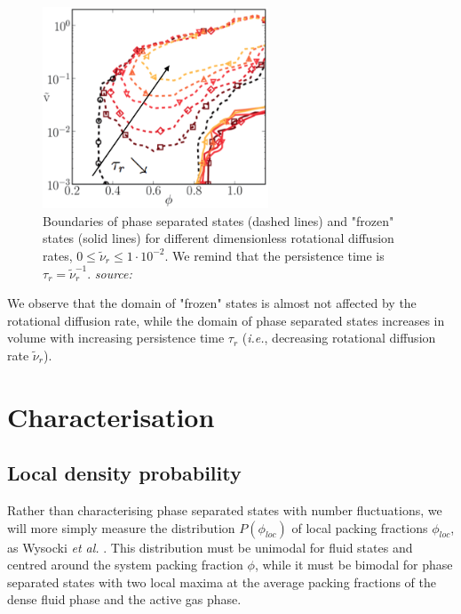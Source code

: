 \documentclass[class=report, float=false, crop=false]{standalone}
\begin{document}
\begin{figure}[h!]
\centering
\includegraphics[width=0.6\textwidth]{figures/images/phase_boundary.png}
\caption{Boundaries of phase separated states (dashed lines) and "frozen" states (solid lines) for different dimensionless rotational diffusion rates, $0 \leq \tilde{\nu}_r \leq 1\cdot10^{-2}$. We remind that the persistence time is $\tau_r = \tilde{\nu}_r^{-1}$. \textit{source:} \cite{fily2014freezing}}
\label{phase_boundary}
\end{figure}

We observe that the domain of "frozen" states is almost not affected by the rotational diffusion rate, while the domain of phase separated states increases in volume with increasing persistence time $\tau_r$ (\textit{i.e.}, decreasing rotational diffusion rate $\tilde{\nu}_r$).

\section{Characterisation}
\label{mips_characterisation}

\subsection{Local density probability}
\label{subsection:local_density_probability}

Rather than characterising phase separated states with number fluctuations, we will more simply measure the distribution $P(\phi_{loc})$ of local packing fractions $\phi_{loc}$, as Wysocki \textit{et al.} \cite{wysocki2014cooperative}. This distribution must be unimodal for fluid states and centred around the system packing fraction $\phi$, while it must be bimodal for phase separated states with two local maxima at the average packing fractions of the dense fluid phase and the active gas phase.\\
\end{document}
